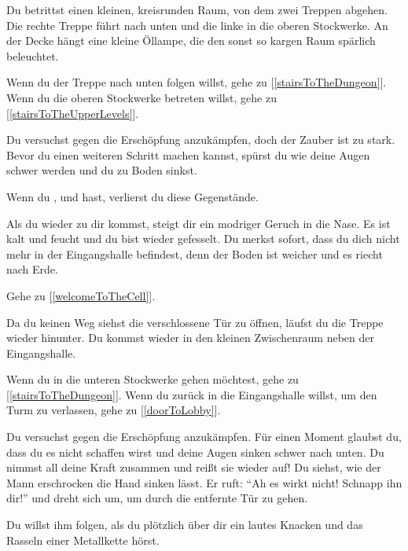 
Du betrittst einen kleinen, kreisrunden Raum, von dem zwei Treppen abgehen. Die rechte Treppe führt nach unten und die linke in die oberen Stockwerke. An der Decke hängt eine kleine Öllampe, die den sonst so kargen Raum spärlich beleuchtet.

Wenn du der Treppe nach unten folgen willst, gehe zu [\ref{stairsToTheDungeon}]. Wenn du die oberen Stockwerke betreten willst, gehe zu [\ref{stairsToTheUpperLevels}].


Du versuchst gegen die Erschöpfung anzukämpfen, doch der Zauber ist zu stark. Bevor du einen weiteren Schritt machen kannst, spürst du wie deine Augen schwer werden und du zu Boden sinkst.

Wenn du ,  und  hast, verlierst du diese Gegenstände.

Als du wieder zu dir kommst, steigt dir ein modriger Geruch in die Nase. Es ist kalt und feucht und du bist wieder gefesselt. Du merkst sofort, dass du dich nicht mehr in der Eingangshalle befindest, denn der Boden ist weicher und es riecht nach Erde.

Gehe zu [\ref{welcomeToTheCell}].


Da du keinen Weg siehst die verschlossene Tür zu öffnen, läufst du die Treppe wieder hinunter. Du kommst wieder in den kleinen Zwischenraum neben der Eingangshalle.

Wenn du in die unteren Stockwerke gehen möchtest, gehe zu [\ref{stairsToTheDungeon}]. Wenn du zurück in die Eingangshalle willst, um den Turm zu verlassen, gehe zu [\ref{doorToLobby}].


Du versuchst gegen die Erschöpfung anzukämpfen. Für einen Moment glaubst du, dass du es nicht schaffen wirst und deine Augen sinken schwer nach unten. Du nimmst all deine Kraft zusammen und reißt sie wieder auf! Du siehst, wie der Mann erschrocken die Hand sinken lässt. Er ruft: ``Ah es wirkt nicht! Schnapp ihn dir!'' und dreht sich um, um durch die entfernte Tür zu gehen.

Du willst ihm folgen, als du plötzlich über dir ein lautes Knacken und das Rasseln einer Metallkette hörst.

